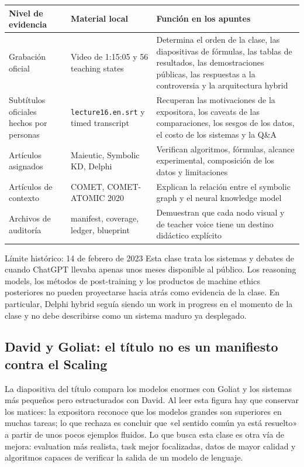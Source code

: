 \documentclass[a4paper]{article}
\begin{document}
\begin{longtable}{@{}L{0.18\textwidth}L{0.27\textwidth}L{0.43\textwidth}@{}}
\toprule
Nivel de evidencia & Material local & Función en los apuntes \\
\midrule
Grabación oficial & Video de 1:15:05 y 56 teaching states & Determina el orden de la clase, las diapositivas de fórmulas, las tablas de resultados, las demostraciones públicas, las respuestas a la controversia y la arquitectura hybrid \\
Subtítulos oficiales hechos por personas & \texttt{lecture16.en.srt} y timed transcript & Recuperan las motivaciones de la expositora, los caveats de las comparaciones, los sesgos de los datos, el costo de los sistemas y la Q\&A \\
Artículos asignados & Maieutic, Symbolic KD, Delphi & Verifican algoritmos, fórmulas, alcance experimental, composición de los datos y limitaciones \\
Artículos de contexto & COMET, COMET-ATOMIC 2020 & Explican la relación entre el symbolic graph y el neural knowledge model \\
Archivos de auditoría & manifest, coverage, ledger, blueprint & Demuestran que cada nodo visual y de teacher voice tiene un destino didáctico explícito \\
\bottomrule
\end{longtable}

\begin{warningbox}{Límite histórico: 14 de febrero de 2023}
Esta clase trata los sistemas y debates de cuando ChatGPT llevaba apenas unos meses disponible al público. Los reasoning models, los métodos de post-training y los productos de machine ethics posteriores no pueden proyectarse hacia atrás como evidencia de la clase. En particular, Delphi hybrid seguía siendo un work in progress en el momento de la clase y no debe describirse como un sistema maduro ya desplegado.
\end{warningbox}

\subsection{David y Goliat: el título no es un manifiesto contra el Scaling}

La diapositiva del título compara los modelos enormes con Goliat y los sistemas más pequeños pero estructurados con David. Al leer esta figura hay que conservar los matices: la expositora reconoce que los modelos grandes son superiores en muchas tareas; lo que rechaza es concluir que «el sentido común ya está resuelto» a partir de unos pocos ejemplos fluidos. Lo que busca esta clase es otra vía de mejora: evaluation más realista, task mejor focalizadas, datos de mayor calidad y algoritmos capaces de verificar la salida de un modelo de lenguaje.
\end{document}
